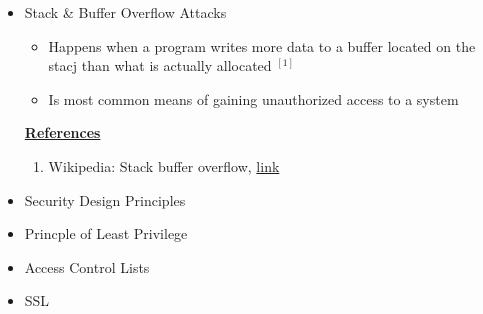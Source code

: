 \documentclass[12pt]{article}
\begin{document}
\begin{itemize}
    \item Stack \& Buffer Overflow Attacks
    \begin{itemize}
        \item Happens when a program writes more data to a buffer located on the
        stacj than what is actually allocated $^{[1]}$
        \item Is most common means of gaining unauthorized access to a system
    \end{itemize}

    \bigskip

    \underline{\textbf{References}}

    \bigskip

    \begin{enumerate}[1)]
        \item Wikipedia: Stack buffer overflow, \href{https://en.wikipedia.org/wiki/Stack_buffer_overflow}{link}
    \end{enumerate}

    \item Security Design Principles
    \item Princple of Least Privilege
    \item Access Control Lists
    \item SSL
\end{itemize}
\end{document}
